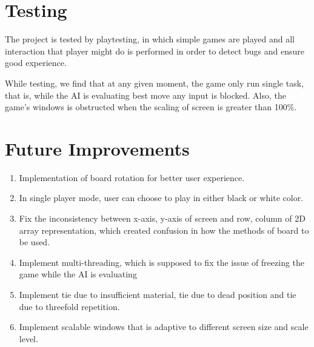 \documentclass[a4paper, 10pt, titlepage]{report}
\begin{document}
\chapter{Testing}

The project is tested by playtesting, in which simple games are played and all interaction that player might do is performed in order to detect bugs and ensure good experience.

While testing, we find that at any given moment, the game only run single task, that is, while the AI is evaluating best move any input is blocked. Also, the game's windows is obstructed when the scaling of screen is greater than 100\%.

\chapter{Future Improvements}
\begin{enumerate}
  \item Implementation of board rotation for better user experience.
  \item In single player mode, user can choose to play in either black or white color.
  \item Fix the inconsistency between x-axis, y-axis of screen and row, column of 2D array representation, which created confusion in how the methods of board to be used. 
  \item Implement multi-threading, which is supposed to fix the issue of freezing the game while the AI is evaluating
  \item Implement tie due to insufficient material, tie due to dead position and tie due to threefold repetition. 
  \item Implement scalable windows that is adaptive to different screen size and scale level.
\end{enumerate}
\end{document}
